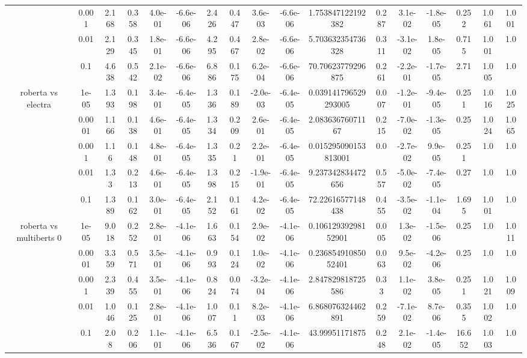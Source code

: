 \begin{tabular}{|c|c|c|c|c|c|c|c|c|c|c|c|c|c|c|c|c|}
 & 0.001 & 2.168 & 0.358 & 4.0e-01 & -6.6e-06 & 2.426 & 0.447 & 3.6e-03 & -6.6e-06 & 1.753847122192382 & 0.287 & 3.1e-02 & -1.8e-05 & 0.252 & 1.061 & 1.001 \\
 & 0.01 & 2.129 & 0.345 & 1.8e-01 & -6.6e-06 & 4.295 & 0.467 & 2.8e-02 & -6.6e-06 & 5.703632354736328 & 0.311 & -3.1e-02 & 1.8e-05 & 0.715 & 1.001 & 1.0 \\
 & 0.1 & 4.638 & 0.542 & 2.1e-02 & -6.6e-06 & 6.886 & 0.175 & 6.2e-04 & -6.6e-06 & 70.70623779296875 & 0.261 & -2.2e-01 & -1.7e-05 & 2.71 & 1.005 & 1.0 \\
\hline
\multirow{5}{*}{roberta  vs electra } & 1e-05 & 1.393 & 0.198 & 3.4e-01 & -6.4e-05 & 1.336 & 0.189 & -2.0e-03 & -6.4e-05 & 0.039141796529293005 & 0.007 & -1.2e-01 & -9.4e-05 & 0.251 & 1.016 & 1.025 \\
 & 0.0001 & 1.166 & 0.138 & 4.6e-01 & -6.4e-05 & 1.334 & 0.209 & 2.6e-01 & -6.4e-05 & 2.08363676071167 & 0.215 & -7.0e-02 & -1.3e-05 & 0.25 & 1.024 & 1.065 \\
 & 0.001 & 1.16 & 0.148 & 4.8e-01 & -6.4e-05 & 1.335 & 0.21 & 2.2e-01 & -6.4e-05 & 0.015295090153813001 & 0.0 & -2.7e-02 & 9.9e-05 & 0.251 & 1.0 & 1.0 \\
 & 0.01 & 1.33 & 0.213 & 4.6e-01 & -6.4e-05 & 1.398 & 0.215 & -1.9e-01 & -6.4e-05 & 9.237342834472656 & 0.557 & -5.0e-02 & -7.4e-05 & 0.27 & 1.0 & 1.0 \\
 & 0.1 & 1.389 & 0.162 & 3.0e-01 & -6.4e-05 & 2.152 & 0.161 & 4.2e-02 & -6.4e-05 & 72.22616577148438 & 0.455 & -3.5e-02 & -1.1e-04 & 1.695 & 1.001 & 1.0 \\
\hline
\multirow{5}{*}{roberta  vs multiberts 0} & 1e-05 & 9.018 & 0.252 & 2.8e-01 & -4.1e-06 & 1.663 & 0.154 & 2.9e-02 & -4.1e-06 & 0.10612939298152901 & 0.005 & 1.3e-02 & -1.5e-06 & 0.25 & 1.0 & 1.011 \\
 & 0.0001 & 3.359 & 0.571 & 3.5e-01 & -4.1e-06 & 0.993 & 0.124 & 1.0e-02 & -4.1e-06 & 0.23685491085052401 & 0.063 & 9.5e-02 & -4.2e-06 & 0.25 & 1.0 & 1.0 \\
 & 0.001 & 2.339 & 0.455 & 3.5e-01 & -4.1e-06 & 0.824 & 0.074 & -3.2e-04 & -4.1e-06 & 2.847829818725586 & 0.33 & 1.1e-02 & 3.8e-05 & 0.251 & 1.021 & 1.009 \\
 & 0.01 & 1.046 & 0.125 & 2.8e-01 & -4.1e-06 & 1.007 & 0.11 & 8.2e-03 & -4.1e-06 & 6.868076324462891 & 0.259 & -7.1e-02 & 8.7e-06 & 0.355 & 1.002 & 1.0 \\
 & 0.1 & 2.08 & 0.206 & 1.1e-01 & -4.1e-06 & 6.536 & 0.167 & -2.5e-02 & -4.1e-06 & 43.99951171875 & 0.248 & 2.1e-02 & -1.4e-05 & 16.652 & 1.003 & 1.0 \\

\end{tabular}
